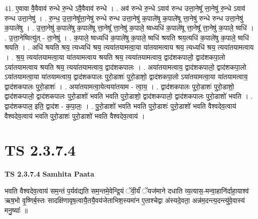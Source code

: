 \documentclass[17pt]{extarticle}
\begin{document}
41. ए॒वावा वै॒वैवाव॑ रुन्धे रु॒न्धे ऽवै॒वैवाव॑ रुन्धे । . अव॑ रुन्धे रु॒न्धे ऽवाव॑ रुन्ध उत्ता॒नेषू᳚ त्ता॒नेषु॑ रु॒न्धे ऽवाव॑ रुन्ध उत्ता॒नेषु॑ । . रु॒न्ध॒ उ॒त्ता॒नेषू᳚त्ता॒नेषु॑ रुन्धे रुन्ध उत्ता॒नेषु॑ क॒पाले॑षु क॒पाले॑षू त्ता॒नेषु॑ रुन्धे रुन्ध उत्ता॒नेषु॑ क॒पाले॑षु । . उ॒त्ता॒नेषु॑ क॒पाले॑षु क॒पाले॑षू त्ता॒नेषू᳚ त्ता॒नेषु॑ क॒पाले॒ ष्वध्यधि॑ क॒पाले॑षू त्ता॒नेषू᳚ त्ता॒नेषु॑ क॒पाले॒ ष्वधि॑ । . उ॒त्ता॒नेष्वित्यु॑त् - ता॒नेषु॑ । . क॒पाले॒ ष्वध्यधि॑ क॒पाले॑षु क॒पाले॒ ष्वधि॑ श्रयति श्रय॒त्यधि॑ क॒पाले॑षु क॒पाले॒ ष्वधि॑ श्रयति । . अधि॑ श्रयति श्रय॒ त्यध्यधि॑ श्रय॒ त्यया॑तयामत्वा॒या या॑तयामत्वाय श्रय॒ त्यध्यधि॑ श्रय॒ त्यया॑तयामत्वाय । . श्र॒य॒ त्यया॑तयामत्वा॒या या॑तयामत्वाय श्रयति श्रय॒ त्यया॑तयामत्वाय॒ द्वाद॑शकपालो॒ द्वाद॑शकपा॒लो ऽया॑तयामत्वाय श्रयति श्रय॒ त्यया॑तयामत्वाय॒ द्वाद॑शकपालः । . अया॑तयामत्वाय॒ द्वाद॑शकपालो॒ द्वाद॑शकपा॒लो ऽया॑तयामत्वा॒या या॑तयामत्वाय॒ द्वाद॑शकपालः पुरो॒डाशः॑ पुरो॒डाशो॒ द्वाद॑शकपा॒लो ऽया॑तयामत्वा॒या या॑तयामत्वाय॒ द्वाद॑शकपालः पुरो॒डाशः॑ । . अया॑तयामत्वा॒येत्यया॑तयाम - त्वा॒य॒ । . द्वाद॑शकपालः पुरो॒डाशः॑ पुरो॒डाशो॒ द्वाद॑शकपालो॒ द्वाद॑शकपालः पुरो॒डाशो॑ भवति भवति पुरो॒डाशो॒ द्वाद॑शकपालो॒ द्वाद॑शकपालः पुरो॒डाशो॑ भवति । . द्वाद॑शकपाल॒ इति॒ द्वाद॑श - क॒पा॒लः॒ । . पु॒रो॒डाशो॑ भवति भवति पुरो॒डाशः॑ पुरो॒डाशो॑ भवति वैश्वदेव॒त्वाय॑ वैश्वदेव॒त्वाय॑ भवति पुरो॒डाशः॑ पुरो॒डाशो॑ भवति वैश्वदेव॒त्वाय॑ । \newline
\pagebreak
{}

\section{ TS 2.3.7.4 }

\textbf{TS 2.3.7.4 } \newline
\textbf{Samhita Paata} \newline

भवति वैश्वदेव॒त्वाय॑ सम॒न्तं प॒र्यव॑द्यति सम॒न्तमे॒वेन्द्रि॒यं ॅवी॒र्यं॑ ॅयज॑माने दधाति व्य॒त्यास॒-मन्वा॒हानि॑र्दाहा॒याश्व॑ ऋष॒भो वृ॒ष्णिर्ब॒स्तः सादक्षि॑णावृष॒त्वायै॒तयै॒वय॑जेताभिश॒स्यमा॑न ए॒ताश्चेद्वा अ॑स्यदे॒वता॒ अन्न॑म॒दन्त्य॒दन्त्यु॑वे॒वास्य॑ मनु॒ष्याः᳚ ॥ \newline
\end{document}
